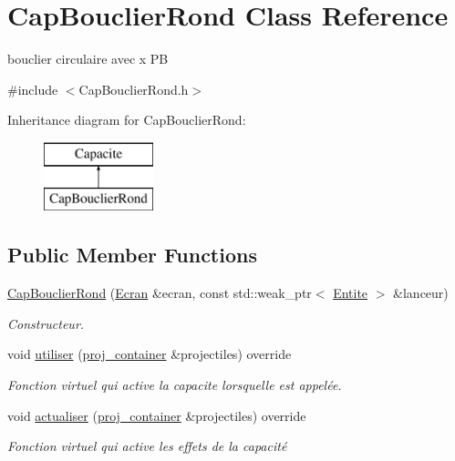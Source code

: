 \hypertarget{class_cap_bouclier_rond}{}\section{Cap\+Bouclier\+Rond Class Reference}
\label{class_cap_bouclier_rond}


bouclier circulaire avec x PB  




{\ttfamily \#include $<$Cap\+Bouclier\+Rond.\+h$>$}

Inheritance diagram for Cap\+Bouclier\+Rond\+:\begin{figure}[H]
\begin{center}
\leavevmode
\includegraphics[height=2.000000cm]{class_cap_bouclier_rond}
\end{center}
\end{figure}
\subsection*{Public Member Functions}
\begin{DoxyCompactItemize}
\item 
\mbox{\hyperlink{class_cap_bouclier_rond_a371bae2937bafb1cef7e1867a93ba8a1}{Cap\+Bouclier\+Rond}} (\mbox{\hyperlink{class_ecran}{Ecran}} \&ecran, const std\+::weak\+\_\+ptr$<$ \mbox{\hyperlink{class_entite}{Entite}} $>$ \&lanceur)
\begin{DoxyCompactList}\small\item\em Constructeur. \end{DoxyCompactList}\item 
void \mbox{\hyperlink{class_cap_bouclier_rond_ae420337d3d5c5ec2e5a4a0cafa8f69ad}{utiliser}} (\mbox{\hyperlink{def__type_8h_a87980cd8ee9533e561a73e8bbc728188}{proj\+\_\+container}} \&projectiles) override
\begin{DoxyCompactList}\small\item\em Fonction virtuel qui active la capacite lorsqu\textquotesingle{}elle est appelée. \end{DoxyCompactList}\item 
void \mbox{\hyperlink{class_cap_bouclier_rond_ab664fc0b17a849d606d1a1085f2095c8}{actualiser}} (\mbox{\hyperlink{def__type_8h_a87980cd8ee9533e561a73e8bbc728188}{proj\+\_\+container}} \&projectiles) override
\begin{DoxyCompactList}\small\item\em Fonction virtuel qui active les effets de la capacité \end{DoxyCompactList}\end{DoxyCompactItemize}
